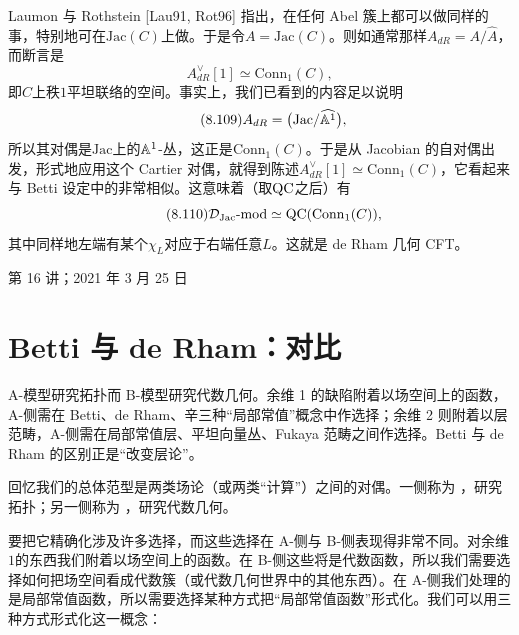 Laumon 与 Rothstein [Lau91, Rot96] 指出，在任何 Abel 簇上都可以做同样的事，特别地可在$\mathrm{Jac}(C)$上做。于是令$A=\mathrm{Jac}(C)$。则如通常那样$A_{dR}=A/\widehat A$，而断言是
\begin{equation}\tag{8.108}
A^{\vee}_{dR}[1]\simeq\mathrm{Conn}_{1}(C),
\end{equation}
即$C$上秩$1$平坦联络的空间。事实上，我们已看到的内容足以说明
\begin{equation}\tag{8.109}
A_{dR}=\bigl(\mathrm{Jac}/\widehat{\mathbb{A}^{1}}\bigr),
\end{equation}
所以其对偶是$\mathrm{Jac}$上的$\mathbb{A}^{1}$-丛，这正是$\mathrm{Conn}_{1}(C)$。于是从 Jacobian 的自对偶出发，形式地应用这个 Cartier 对偶，就得到陈述$A^{\vee}_{dR}[1]\simeq\mathrm{Conn}_{1}(C)$，它看起来与 Betti 设定中的非常相似。这意味着（取$\mathrm{QC}$之后）有
\begin{equation}\tag{8.110}
\mathcal D_{\mathrm{Jac}}\text{-mod}\simeq\mathrm{QC}(\mathrm{Conn}_{1}(C)),
\end{equation}
其中同样地左端有某个$\chi_L$对应于右端任意$L$。这就是 de Rham 几何 CFT。

\begin{flushright}\small 第 16 讲；2021 年 3 月 25 日\end{flushright}

\section{Betti 与 de Rham：对比}\label{sec:8.3}
\begin{sectionkey}
A-模型研究拓扑而 B-模型研究代数几何。余维 1 的缺陷附着以场空间上的函数，A-侧需在 Betti、de Rham、辛三种“局部常值”概念中作选择；余维 2 则附着以层范畴，A-侧需在局部常值层、平坦向量丛、Fukaya 范畴之间作选择。Betti 与 de Rham 的区别正是“改变层论”。
\end{sectionkey}

回忆我们的总体范型是两类场论（或两类“计算”）之间的对偶。一侧称为 ，研究拓扑；另一侧称为 ，研究代数几何。

要把它精确化涉及许多选择，而这些选择在 A-侧与 B-侧表现得非常不同。对余维$1$的东西我们附着以场空间上的函数。在 B-侧这些将是代数函数，所以我们需要选择如何把场空间看成代数簇（或代数几何世界中的其他东西）。在 A-侧我们处理的是局部常值函数，所以需要选择某种方式把“局部常值函数”形式化。我们可以用三种方式形式化这一概念：

